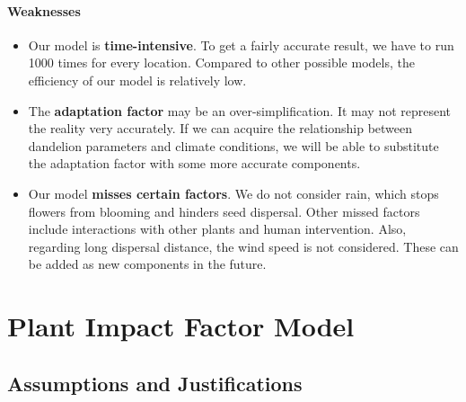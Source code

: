 \documentclass[12pt]{article}
\begin{document}
			\paragraph{Weaknesses}
			\vspace{-0.5cm}
			\begin{itemize}
				\vspace{-0.3cm}
				\item Our model is \textbf{time-intensive}.  To get a fairly accurate result, we have to run 1000 times for every location.  Compared to other possible models, the efficiency of our model is relatively low.
				
				\vspace{-0.3cm}
				\item The \textbf{adaptation factor} may be an over-simplification.  It may not represent the reality very accurately.  If we can acquire the relationship between dandelion parameters and climate conditions, we will be able to substitute the adaptation factor with some more accurate components.
				
				\vspace{-0.3cm}
				\item Our model \textbf{misses certain factors}.  We do not consider rain, which stops flowers from blooming and hinders seed dispersal.  Other missed factors include interactions with other plants and human intervention.  Also, regarding long dispersal distance, the wind speed is not considered.  These can be added as new components in the future.
				
			\end{itemize}

		
		
		
		
\section{Plant Impact Factor Model}

	\subsection{Assumptions and Justifications}
	
\end{document}

